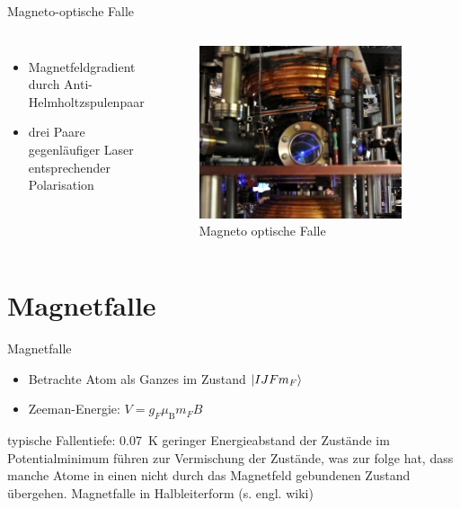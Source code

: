 \documentclass[12pt,xcolor=dvipsnames]{beamer}
\begin{document}
\begin{frame}{Magneto-optische Falle}
\begin{columns}
\begin{itemize}

	\item Magnetfeldgradient durch Anti-Helmholtzspulenpaar
		
	\item drei Paare gegenläufiger Laser entsprechender Polarisation

\end{itemize}

	\begin{figure}
		\centering
		\includegraphics[width=0.9\textwidth]{./figures/mot_columbia.jpg}
		\caption{Magneto optische Falle \cite{columbia}}
	\end{figure}
\end{columns}
\end{frame}


\section{Magnetfalle}

\begin{frame}{Magnetfalle}

\begin{itemize}
	\item Betrachte Atom als Ganzes im Zustand $\ket{I J F m_F}$
	\item Zeeman-Energie: $V = g_F \mu_\mathrm{B} m_F B$
\end{itemize}

typische Fallentiefe: \SI{0.07}{\kelvin}
geringer Energieabstand der Zustände im Potentialminimum führen zur Vermischung der Zustände, was zur folge hat, dass manche Atome in einen nicht durch das Magnetfeld gebundenen Zustand übergehen.
Magnetfalle in Halbleiterform (s. engl. wiki)
\end{frame}
\end{document}
